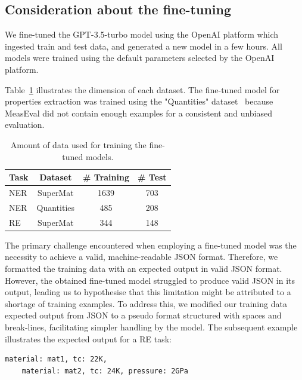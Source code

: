 \documentclass[a4paper]{article}
\begin{document}
\subsection{Consideration about the fine-tuning}

We fine-tuned the GPT-3.5-turbo model using the OpenAI platform which ingested train and test data, and generated a new model in a few hours. 
All models were trained using the default parameters selected by the OpenAI platform.

Table~\ref{tab:amount-data-fine-tuned} illustrates the dimension of each dataset. 
The fine-tuned model for properties extraction was trained using the "Quantities" dataset~\cite{foppiano2019quantities} because MeasEval did not contain enough examples for a consistent and unbiased evaluation. 

\begin{table}[htbp]
    \centering
    \label{tab:amount-data-fine-tuned}
    \caption{Amount of data used for training the fine-tuned models.}
    \begin{tabular}{lccc}
        Task & Dataset & \# Training & \# Test \\
        \toprule
        NER & SuperMat   & 1639 & 703 \\
        NER & Quantities & 485 & 208 \\
        RE  & SuperMat   & 344 & 148 \\
        \bottomrule
    \end{tabular}
\end{table}

The primary challenge encountered when employing a fine-tuned model was the necessity to achieve a valid, machine-readable JSON format. 
Therefore, we formatted the training data with an expected output in valid JSON format. 
However, the obtained fine-tuned model struggled to produce valid JSON in its output, leading us to hypothesise that this limitation might be attributed to a shortage of training examples. 
To address this, we modified our training data expected output from JSON to a pseudo format structured with spaces and break-lines, facilitating simpler handling by the model. The subsequent example illustrates the expected output for a RE task:

\begin{lstlisting}[caption=Example format of the expected answer for the RE task]
    material: mat1, tc: 22K, 
    material: mat2, tc: 24K, pressure: 2GPa
\end{lstlisting}
\end{document}

